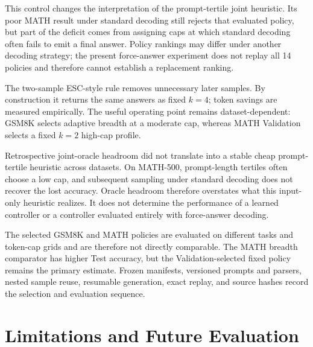 \documentclass[runningheads]{llncs}
\begin{document}
This control changes the interpretation of the prompt-tertile joint heuristic.
Its poor MATH result under standard decoding still rejects that evaluated
policy, but part of the deficit comes from assigning caps at which standard
decoding often fails to emit a final answer. Policy rankings may differ under
another decoding strategy; the present force-answer experiment does not replay
all 14 policies and therefore cannot establish a replacement ranking.

The two-sample ESC-style rule removes unnecessary later samples. By
construction it returns the same answers as fixed $k=4$; token savings are
measured empirically. The useful operating point remains dataset-dependent:
GSM8K selects adaptive breadth at a moderate cap, whereas MATH Validation
selects a fixed $k=2$ high-cap profile.

Retrospective joint-oracle headroom did not translate into a stable cheap
prompt-tertile heuristic across datasets. On MATH-500, prompt-length tertiles
often choose a low cap, and subsequent sampling under standard decoding does
not recover the lost accuracy. Oracle headroom therefore overstates what this
input-only heuristic realizes. It does not determine the performance of a
learned controller or a controller evaluated entirely with force-answer
decoding.

The selected GSM8K and MATH policies are evaluated on different tasks and
token-cap grids and are therefore not directly comparable. The MATH breadth
comparator has higher Test accuracy, but the Validation-selected fixed policy
remains the primary estimate. Frozen manifests, versioned prompts and parsers,
nested sample reuse, resumable generation, exact replay, and source hashes
record the selection and evaluation sequence.

\section{Limitations and Future Evaluation}
\end{document}
